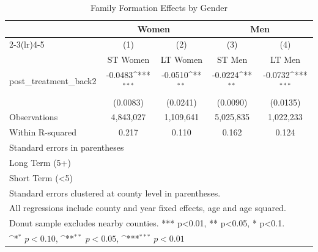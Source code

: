 \begin{table}[htbp]\centering
\def\sym#1{\ifmmode^{#1}\else\(^{#1}\)\fi}
\caption{Family Formation Effects by Gender}
\begin{tabular}{l*{4}{c}}
\hline\hline
            &\multicolumn{2}{c}{Women}                  &\multicolumn{2}{c}{Men}                    \\\cmidrule(lr){2-3}\cmidrule(lr){4-5}
            &\multicolumn{1}{c}{(1)}&\multicolumn{1}{c}{(2)}&\multicolumn{1}{c}{(3)}&\multicolumn{1}{c}{(4)}\\
            &\multicolumn{1}{c}{ST Women}&\multicolumn{1}{c}{LT Women}&\multicolumn{1}{c}{ST Men}&\multicolumn{1}{c}{LT Men}\\
\hline
post\_treatment\_back2&     -0.0483\sym{***}&     -0.0510\sym{**} &     -0.0224\sym{**} &     -0.0732\sym{***}\\
            &    (0.0083)         &    (0.0241)         &    (0.0090)         &    (0.0135)         \\
\hline
Observations&   4,843,027         &   1,109,641         &   5,025,835         &   1,022,233         \\
Within R-squared&       0.217         &       0.110         &       0.162         &       0.124         \\
\hline\hline
\multicolumn{5}{l}{\footnotesize Standard errors in parentheses}\\
\multicolumn{5}{l}{\footnotesize Long Term (5+)}\\
\multicolumn{5}{l}{\footnotesize Short Term (<5)}\\
\multicolumn{5}{l}{\footnotesize Standard errors clustered at county level in parentheses.}\\
\multicolumn{5}{l}{\footnotesize All regressions include county and year fixed effects, age and age squared.}\\
\multicolumn{5}{l}{\footnotesize Donut sample excludes nearby counties. *** p<0.01, ** p<0.05, * p<0.1.}\\
\multicolumn{5}{l}{\footnotesize \sym{*} \(p<0.10\), \sym{**} \(p<0.05\), \sym{***} \(p<0.01\)}\\
\end{tabular}
\end{table}
